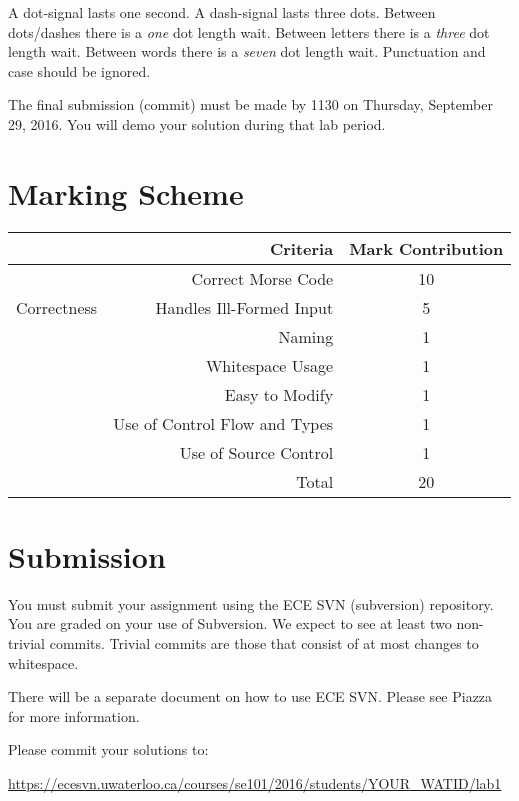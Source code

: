 \documentclass{article}
\begin{document}
A dot-signal lasts one second.  A dash-signal lasts three dots.  Between dots/dashes there is a \emph{one} dot length wait.  Between letters there is a \emph{three} dot length wait.  Between words there is a \emph{seven} dot length wait.  Punctuation and case should be ignored.

The final submission (commit) must be made by 1130 on Thursday, September 29, 2016. You will demo your solution during that lab period.

\section*{Marking Scheme}
\begin{center}
\begin{tabular}[c]{cr|c}
&\textbf{Criteria} & \textbf{Mark Contribution} \\ \hline
\multirow{3}{*}{Correctness} 
	& Correct Morse Code & 10 \\
	& Handles Ill-Formed Input & 5 \\

\multirow{4}{*}{Style} 
	& Naming & 1 \\
    	& Whitespace Usage & 1 \\
	& Easy to Modify & 1 \\
	& Use of Control Flow and Types & 1 \\
	& Use of Source Control & 1 \\ \hhline{==|=}
	
& Total & 20 \\ 
\end{tabular}
\end{center}

\section*{Submission}
You must submit your assignment using the ECE SVN (subversion) repository.  You are graded on your use of Subversion.  We expect to see at least two non-trivial commits. Trivial commits are those that consist of at most changes to whitespace.

There will be a separate document on how to use ECE SVN.  Please see Piazza for more information.

Please commit your solutions to:

\begin{center}
\url{https://ecesvn.uwaterloo.ca/courses/se101/2016/students/YOUR\_WATID/lab1}
\end{center}
\end{document}

